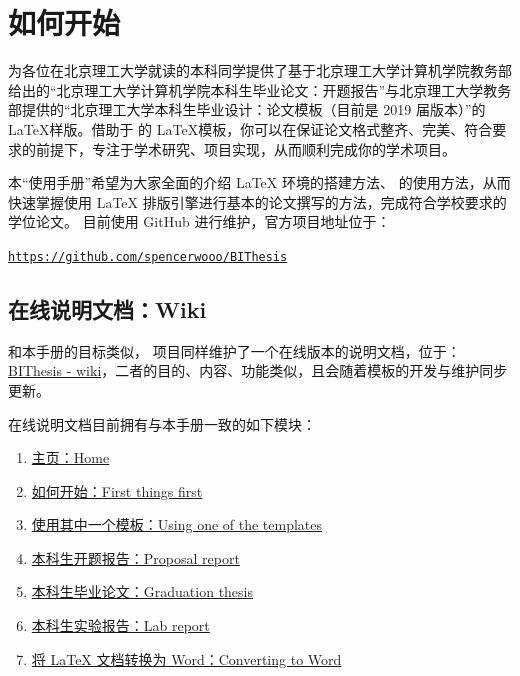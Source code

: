 \section{如何开始}
{\BIThesis} 为各位在北京理工大学就读的本科同学提供了基于北京理工大学计算机学院教务部给出的“北京理工大学计算机学院本科生毕业论文：开题报告”与北京理工大学教务部提供的“北京理工大学本科生毕业设计：论文模板（目前是 2019 届版本）”的 \LaTeX 样版。借助于 {\BIThesis} 的 \LaTeX 模板，你可以在保证论文格式整齐、完美、符合要求的前提下，专注于学术研究、项目实现，从而顺利完成你的学术项目。

本“使用手册”希望为大家全面的介绍 {\LaTeX} 环境的搭建方法、{\BIThesis} 的使用方法，从而快速掌握使用 {\LaTeX} 排版引擎进行基本的论文撰写的方法，完成符合学校要求的学位论文。{\BIThesis} 目前使用 GitHub 进行维护，官方项目地址位于：

\begin{center}
\color{ForestGreen}\href{https://github.com/spencerwooo/BIThesis}{\texttt{https://github.com/spencerwooo/BIThesis}}
\end{center}

\subsection{在线说明文档：Wiki}
和本手册的目标类似，{\BIThesis} 项目同样维护了一个在线版本的说明文档，位于：{\href{https://github.com/spencerwooo/BIThesis/wiki}{BIThesis - wiki}}，二者的目的、内容、功能类似，且会随着模板的开发与维护同步更新。

{\BIThesis} 在线说明文档目前拥有与本手册一致的如下模块：

\begin{enumerate}
\item \href{https://github.com/spencerwooo/BIThesis/wiki}{主页：Home}
\item \href{https://github.com/spencerwooo/BIThesis/wiki/First-things-first}{如何开始：First things first }
\item \href{https://github.com/spencerwooo/BIThesis/wiki/Using-one-of-the-templates}{使用其中一个模板：Using one of the templates}
\item \href{https://github.com/spencerwooo/BIThesis/wiki/Proposal-Report}{本科生开题报告：Proposal report}
\item \href{https://github.com/spencerwooo/BIThesis/wiki/Final-Graduation-Thesis}{本科生毕业论文：Graduation thesis}
\item \href{https://github.com/spencerwooo/BIThesis/wiki/Lab-Report}{本科生实验报告：Lab report}
\item \href{https://github.com/spencerwooo/BIThesis/wiki/Converting-to-Word}{将 LaTeX 文档转换为 Word：Converting to Word}
\end{enumerate}

